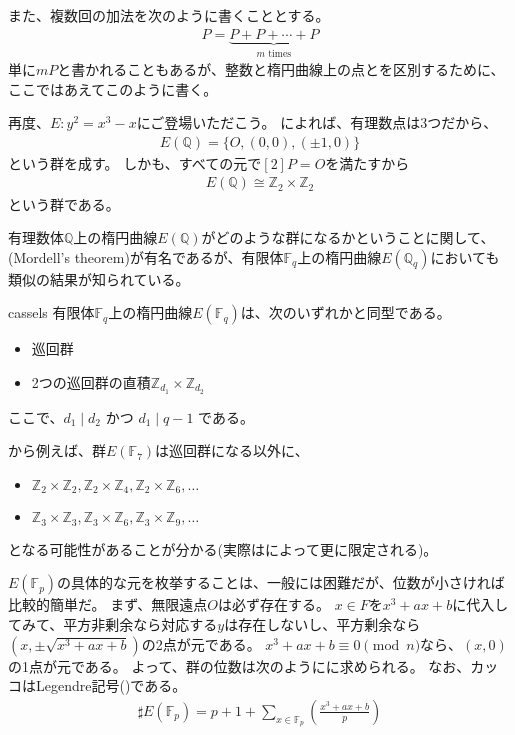 また、複数回の加法を次のように書くこととする。
\begin{align*}
[m]P = \underbrace{P+P+\cdots+P }_{m\text{ times}}
\end{align*}
単に$mP$と書かれることもあるが、整数と楕円曲線上の点とを区別するために、ここではあえてこのように書く。

再度、$E:y^2=x^3-x$にご登場いただこう。
によれば、有理数点は3つだから、
\begin{align*}
E(\mathbb{Q}) = \{O, (0,0), (\pm1,0)\}
\end{align*}
という群を成す。
しかも、すべての元で$[2]P=O$を満たすから
\begin{align*}
E(\mathbb{Q}) \cong \mathbb{Z}_2 \times \mathbb{Z}_2
\end{align*}
という群である。

有理数体$\mathbb{Q}$上の楕円曲線$E(\mathbb{Q})$がどのような群になるかということに関して、(Mordell's theorem)が有名であるが、有限体$\mathbb{F}_q$上の楕円曲線$E(\mathbb{Q}_q)$においても類似の結果が知られている。

\begin{Theo}{\cite{Cassels1966DiophantineEW}}{cassels}
有限体$\mathbb{F}_q$上の楕円曲線$E(\mathbb{F}_q)$は、次のいずれかと同型である。
\begin{itemize}
 \item 巡回群
 \item 2つの巡回群の直積$\mathbb{Z}_{d_1}\times\mathbb{Z}_{d_2}$
\end{itemize}
ここで、$d_1 \mid d_2$ かつ $d_1 \mid q - 1$ である。
\end{Theo}

から例えば、群$E(\mathbb{F}_7)$は巡回群になる以外に、
\begin{itemize}
 \item $\mathbb{Z}_2 \times \mathbb{Z}_2, \mathbb{Z}_2 \times \mathbb{Z}_4, \mathbb{Z}_2 \times \mathbb{Z}_6,\ldots$
 \item $\mathbb{Z}_3 \times \mathbb{Z}_3, \mathbb{Z}_3 \times \mathbb{Z}_6, \mathbb{Z}_3 \times \mathbb{Z}_9,\ldots$
\end{itemize}
となる可能性があることが分かる(実際はによって更に限定される)。

$E(\mathbb{F}_p)$の具体的な元を枚挙することは、一般には困難だが、位数が小さければ比較的簡単だ。
まず、無限遠点$O$は必ず存在する。
$x\in F$を$x^3+ax+b$に代入してみて、平方非剰余なら対応する$y$は存在しないし、平方剰余なら$(x,\pm\sqrt{x^3+ax+b})$の2点が元である。
$x^3+ax+b \equiv 0 \pmod{n}$なら、$(x,0)$の1点が元である。
よって、群の位数は次のようにに求められる。
なお、カッコはLegendre記号()である。
\begin{align*}
\sharp E(\mathbb{F}_p) = p + 1 + \sum_{x \in \mathbb{F}_p} \left( \frac{x^3+ax+b}{p} \right)
\end{align*}

